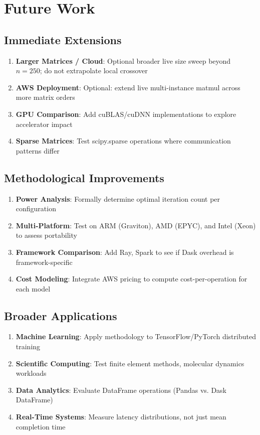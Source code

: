 \section{Future Work}

\subsection{Immediate Extensions}

\begin{enumerate}
    \item \textbf{Larger Matrices / Cloud}: Optional broader live size sweep beyond $n{=}250$; do not extrapolate local crossover
    \item \textbf{AWS Deployment}: Optional: extend live multi-instance matmul across more matrix orders
    \item \textbf{GPU Comparison}: Add cuBLAS/cuDNN implementations to explore accelerator impact
    \item \textbf{Sparse Matrices}: Test scipy.sparse operations where communication patterns differ
\end{enumerate}

\subsection{Methodological Improvements}

\begin{enumerate}
    \item \textbf{Power Analysis}: Formally determine optimal iteration count per configuration
    \item \textbf{Multi-Platform}: Test on ARM (Graviton), AMD (EPYC), and Intel (Xeon) to assess portability
    \item \textbf{Framework Comparison}: Add Ray, Spark to see if Dask overhead is framework-specific
    \item \textbf{Cost Modeling}: Integrate AWS pricing to compute cost-per-operation for each model
\end{enumerate}

\subsection{Broader Applications}

\begin{enumerate}
    \item \textbf{Machine Learning}: Apply methodology to TensorFlow/PyTorch distributed training
    \item \textbf{Scientific Computing}: Test finite element methods, molecular dynamics workloads
    \item \textbf{Data Analytics}: Evaluate DataFrame operations (Pandas vs. Dask DataFrame)
    \item \textbf{Real-Time Systems}: Measure latency distributions, not just mean completion time
\end{enumerate}

